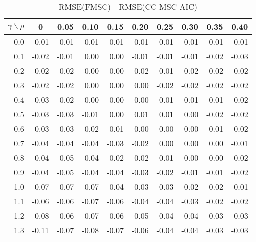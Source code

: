 \documentclass[12pt]{article}
\begin{document}
%
\begin{table}[!tbp]
\caption{RMSE(FMSC) - RMSE(CC-MSC-AIC)}
 \begin{center}
 \begin{tabular}{r|rrrrrrrrr}\hline\hline
\multicolumn{1}{c|}{$\gamma\backslash\rho$}&\multicolumn{1}{c}{0}&\multicolumn{1}{c}{0.05}&\multicolumn{1}{c}{0.10}&\multicolumn{1}{c}{0.15}&\multicolumn{1}{c}{0.20}&\multicolumn{1}{c}{0.25}&\multicolumn{1}{c}{0.30}&\multicolumn{1}{c}{0.35}&\multicolumn{1}{c}{0.40}\tabularnewline
\hline
0.0&-0.01&-0.01&-0.01&-0.01&-0.01&-0.01&-0.01&-0.01&-0.01\tabularnewline
0.1&-0.02&-0.01& 0.00& 0.00&-0.01&-0.01&-0.01&-0.02&-0.03\tabularnewline
0.2&-0.02&-0.02& 0.00& 0.00&-0.02&-0.01&-0.02&-0.02&-0.02\tabularnewline
0.3&-0.02&-0.02& 0.00& 0.00& 0.00&-0.02&-0.02&-0.02&-0.02\tabularnewline
0.4&-0.03&-0.02& 0.00& 0.00& 0.00&-0.01&-0.01&-0.01&-0.02\tabularnewline
0.5&-0.03&-0.03&-0.01& 0.00& 0.01& 0.01& 0.00&-0.02&-0.02\tabularnewline
0.6&-0.03&-0.03&-0.02&-0.01& 0.00& 0.00& 0.00&-0.01&-0.02\tabularnewline
0.7&-0.04&-0.04&-0.04&-0.03&-0.02& 0.00& 0.00& 0.00&-0.01\tabularnewline
0.8&-0.04&-0.05&-0.04&-0.02&-0.02&-0.01& 0.00& 0.00&-0.02\tabularnewline
0.9&-0.04&-0.05&-0.04&-0.04&-0.03&-0.02&-0.01&-0.01&-0.02\tabularnewline
1.0&-0.07&-0.07&-0.07&-0.04&-0.03&-0.03&-0.02&-0.02&-0.01\tabularnewline
1.1&-0.06&-0.06&-0.07&-0.06&-0.04&-0.04&-0.03&-0.02&-0.02\tabularnewline
1.2&-0.08&-0.06&-0.07&-0.06&-0.05&-0.04&-0.04&-0.03&-0.03\tabularnewline
1.3&-0.11&-0.07&-0.08&-0.07&-0.06&-0.04&-0.04&-0.03&-0.03\tabularnewline
\hline
\end{tabular}

\end{center}

\end{table}
\end{document}
